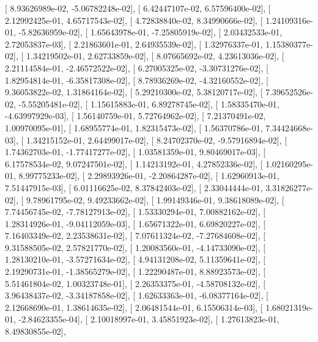 \documentclass{article}
\begin{document}
       [  8.93626989e-02,  -5.06782248e-02],
       [  6.42447107e-02,   6.57596400e-02],
       [  2.12992425e-01,   4.65717543e-02],
       [  4.72838840e-02,   8.34990666e-02],
       [  1.24109316e-01,  -5.82636959e-02],
       [  1.65643978e-01,  -7.25805919e-02],
       [  2.03432533e-01,   2.72053837e-03],
       [  2.21863601e-01,   2.64935539e-02],
       [  1.32976337e-01,   1.15380377e-02],
       [  1.34219502e-01,   2.62733859e-02],
       [  8.07665692e-02,   4.23613036e-02],
       [  2.21114584e-01,  -2.46572522e-02],
       [  6.27005325e-02,  -3.30731276e-02],
       [  1.82954814e-01,  -6.35817308e-02],
       [  8.78936269e-02,  -4.32160552e-02],
       [  9.36053822e-02,   1.31864164e-02],
       [  5.29210300e-02,   5.38120717e-02],
       [  7.39652526e-02,  -5.55205481e-02],
       [  1.15615883e-01,   6.89278745e-02],
       [  1.58335470e-01,  -4.63997929e-03],
       [  1.56140759e-01,   5.72764962e-02],
       [  7.21370491e-02,   1.00970095e-01],
       [  1.68955774e-01,   1.82315473e-02],
       [  1.56370786e-01,   7.34424668e-03],
       [  1.34215152e-01,   2.64499017e-02],
       [  8.24702370e-02,  -9.57916894e-02],
       [  1.74362703e-01,  -1.77417277e-02],
       [  1.03581359e-01,   9.80469017e-03],
       [  6.17578534e-02,   9.07247501e-02],
       [  1.14213192e-01,   4.27852336e-02],
       [  1.02160295e-01,   8.99775233e-02],
       [  2.29893926e-01,  -2.20864287e-02],
       [  1.62960913e-01,   7.51447915e-03],
       [  6.01116625e-02,   8.37842403e-02],
       [  2.33044444e-01,   3.31826277e-02],
       [  9.78961795e-02,   9.49233662e-02],
       [  1.99149346e-01,   9.38618089e-02],
       [  7.74456745e-02,  -7.78127913e-02],
       [  1.53330294e-01,   7.00882162e-02],
       [  1.28314926e-01,  -9.04112059e-03],
       [  1.65671322e-01,   6.69820227e-02],
       [  7.16403349e-02,   2.23538631e-02],
       [  7.07611324e-02,  -7.27684608e-02],
       [  9.31588505e-02,   2.57821770e-02],
       [  1.20083560e-01,  -4.14733090e-02],
       [  1.28130210e-01,  -3.57271634e-02],
       [  4.94131208e-02,   5.11359641e-02],
       [  2.19290731e-01,  -1.38565279e-02],
       [  1.22290487e-01,   8.88923573e-02],
       [  5.51461804e-02,   1.00323748e-01],
       [  2.26353375e-01,  -4.58708132e-02],
       [  3.96438437e-02,  -3.34187858e-02],
       [  1.62633363e-01,  -6.08377164e-02],
       [  2.12668690e-01,   1.38614635e-02],
       [  2.06481544e-01,   6.15506314e-03],
       [  1.68021319e-01,  -2.84623355e-04],
       [  2.10018997e-01,   3.45851923e-02],
       [  1.27613823e-01,   8.49830855e-02],
\end{document}
